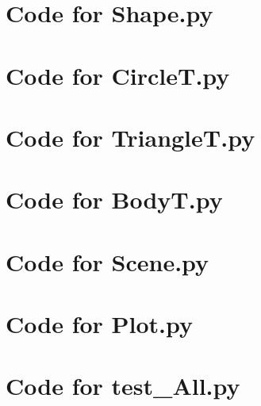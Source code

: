 \documentclass[12pt]{article}
\begin{document}
\def\thesection{\Alph{section}}

\section{Code for Shape.py}

\noindent 

\newpage

\section{Code for CircleT.py}

\noindent 

\newpage

\section{Code for TriangleT.py}

\noindent 

\newpage

\section{Code for BodyT.py}

\noindent 

\newpage

\section{Code for Scene.py}

\noindent 

\newpage

\section{Code for Plot.py}

\noindent 

\newpage

\section{Code for test\_All.py}

\noindent 

\newpage
\end{document}
